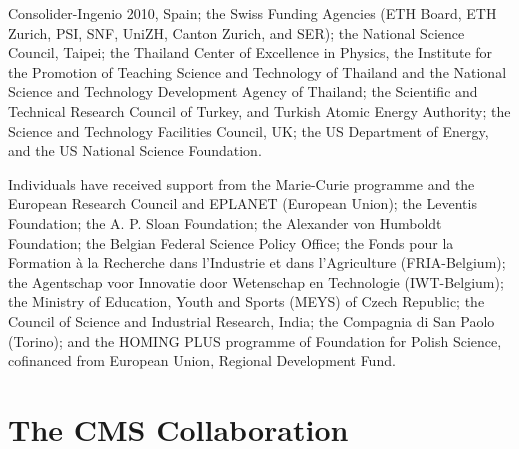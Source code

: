 \documentclass[11pt,twoside,a4paper,cmspaper,final,collab]{cms-tdr}
\begin{document}
Consolider-Ingenio 2010, Spain; the Swiss Funding Agencies (ETH Board, ETH Zurich, PSI, SNF, UniZH, Canton Zurich, and SER); the National Science Council, Taipei; the Thailand Center of Excellence in Physics, the Institute for the Promotion of Teaching Science and Technology of Thailand and the National Science and Technology Development Agency of Thailand; the Scientific and Technical Research Council of Turkey, and Turkish Atomic Energy Authority; the Science and Technology Facilities Council, UK; the US Department of Energy, and the US National Science Foundation.

Individuals have received support from the Marie-Curie programme and the European Research Council and EPLANET (European Union); the Leventis Foundation; the A. P. Sloan Foundation; the Alexander von Humboldt Foundation; the Belgian Federal Science Policy Office; the Fonds pour la Formation \`a la Recherche dans l'Industrie et dans l'Agriculture (FRIA-Belgium); the Agentschap voor Innovatie door Wetenschap en Technologie (IWT-Belgium); the Ministry of Education, Youth and Sports (MEYS) of Czech Republic; the Council of Science and Industrial Research, India; the Compagnia di San Paolo (Torino); and the HOMING PLUS programme of Foundation for Polish Science, cofinanced from European Union, Regional Development Fund.




\cleardoublepage \appendix\section{The CMS Collaboration \label{app:collab}}\begin{sloppypar}\end{sloppypar}
\end{document}
